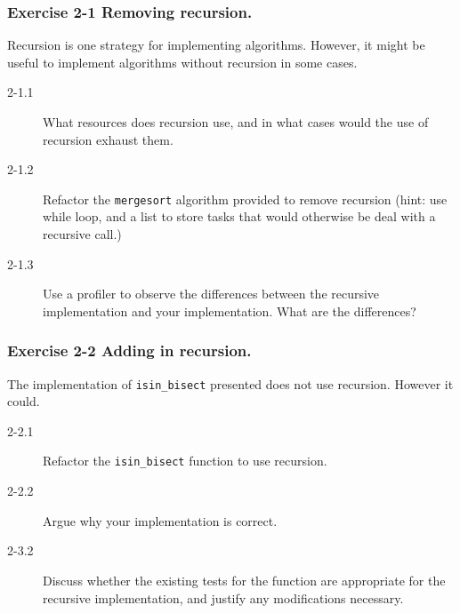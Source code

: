 \documentclass{beamer} %
\begin{document}
\begin{frame}
\frametitle{Exercise 2-1 Removing recursion.}

Recursion is one strategy for implementing algorithms. However, it might be useful to implement algorithms without recursion in some cases.
\begin{description}
	\item[2-1.1] What resources does recursion use, and in what cases would the use of recursion exhaust them.
	\item[2-1.2] Refactor the \texttt{mergesort} algorithm provided to remove recursion (hint: use while loop, and a list to store tasks that would otherwise be deal with a recursive call.)
	\item[2-1.3] Use a profiler to observe the differences between the recursive implementation and your implementation. What are the differences?
\end{description}

\end{frame}

\begin{frame}
\frametitle{Exercise 2-2 Adding in recursion.}

The implementation of \texttt{isin\_bisect} presented does not use recursion. However it could.
\begin{description}
	\item[2-2.1] Refactor the \texttt{isin\_bisect} function to use recursion.
	\item[2-2.2] Argue why your implementation is correct.
	\item[2-3.2] Discuss whether the existing tests for the function are appropriate for the recursive implementation, and justify any modifications necessary.
\end{description}

\end{frame}
\end{document}
